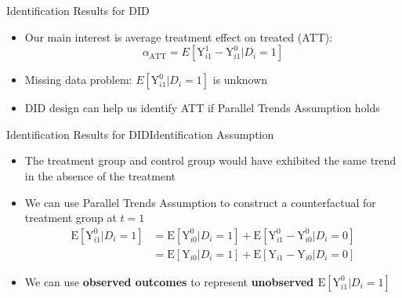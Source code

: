 \documentclass[dvipsnames,hyperref={pdfpagelabels=false}]{beamer}
\begin{document}
\begin{frame}{Identification Results for DID}
\begin{itemize} 
\item Our main interest is average treatment effect on treated (ATT):
\begin{equation*}
\alpha_{\text{ATT}}=E[\mathrm{Y}^{1}_{i1}-\mathrm{Y}^{0}_{i1}|D_{i}=1]
\end{equation*}
\vspace{0.2cm}
\item Missing data problem: $E[\mathrm{Y}^{0}_{i1}|D_{i}=1]$ is unknown
\vspace{0.3cm}
\item DID design can help us identify ATT if Parallel Trends Assumption holds

\end{itemize}
\end{frame}





\begin{frame}{Identification Results for DID}{Identification Assumption}
\begin{itemize} 

\begin{block}{Parallel Trends Assumption}
\begin{align*}
E[\mathrm{Y}^{0}_{i1}-\mathrm{Y}^{0}_{i0}|D_{i}=1]&=E[\mathrm{Y}^{0}_{i1}-\mathrm{Y}^{0}_{i0}|D_{i}=0]  \\
&=E[\mathrm{Y}_{i1}-\mathrm{Y}_{i0}|D_{i}=0]
\end{align*}
\end{block}
\item The treatment group and control group would have exhibited the same trend in the absence of the treatment
\vspace{0.2cm}
\item We can use Parallel Trends Assumption to construct a counterfactual for treatment group at $t=1$
\begin{align*}
\mathrm{E}[\mathrm{Y}^{0}_{i1} |D_{i}=1] &= \mathrm{E}[\mathrm{Y}^{0}_{i0}|D_{i}=1] + \mathrm{E}[\mathrm{Y}^{0}_{i1}-\mathrm{Y}^{0}_{i0}|D_{i}=0]  \\
&= \mathrm{E}[\mathrm{Y}_{i0}|D_{i}=1] + \mathrm{E}[\mathrm{Y}_{i1}-\mathrm{Y}_{i0}|D_{i}=0]
\end{align*}

\item We can use \textbf{observed outcomes} to represent \textbf{unobserved $\mathrm{E}[\mathrm{Y}^{0}_{i1} |D_{i}=1]$}

\end{itemize}
\end{frame}
\end{document}
